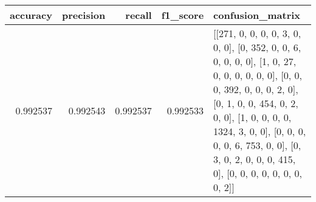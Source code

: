 \begin{tabular}{rrrrl}
\toprule
accuracy & precision & recall & f1_score & confusion_matrix \\
\midrule
0.992537 & 0.992543 & 0.992537 & 0.992533 & [[271, 0, 0, 0, 0, 3, 0, 0, 0], [0, 352, 0, 0, 6, 0, 0, 0, 0], [1, 0, 27, 0, 0, 0, 0, 0, 0], [0, 0, 0, 392, 0, 0, 0, 2, 0], [0, 1, 0, 0, 454, 0, 2, 0, 0], [1, 0, 0, 0, 0, 1324, 3, 0, 0], [0, 0, 0, 0, 0, 6, 753, 0, 0], [0, 3, 0, 2, 0, 0, 0, 415, 0], [0, 0, 0, 0, 0, 0, 0, 0, 2]] \\
\bottomrule
\end{tabular}
